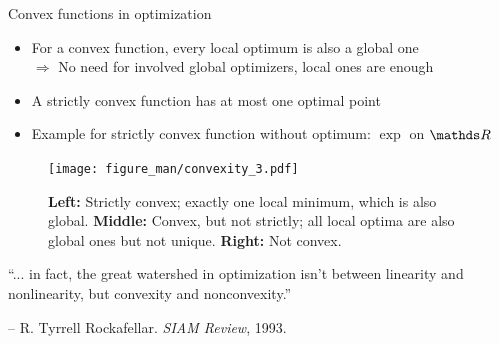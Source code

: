 \documentclass[11pt,compress,t,notes=noshow, xcolor=table]{beamer}
\begin{document}
\begin{vbframe}{Convex functions in optimization}

\begin{itemize}
    \item For a convex function, every local optimum is also a global one \\
        $\Rightarrow$ No need for involved global optimizers, local ones are enough
    \item A strictly convex function has at most one optimal point
    \item Example for strictly convex function without optimum: $\exp$ on $\R$
\end{itemize}

\begin{figure}
    \centering
    \texttt{[image: figure\_man/convexity\_3.pdf]}
    \caption*{\footnotesize
        \textbf{Left:} Strictly convex; exactly one local minimum, which is also global.
        \textbf{Middle:} Convex, but not strictly; all local optima are also global ones but not unique.
        \textbf{Right:} Not convex.}
\end{figure}

\framebreak


    {\large \enquote{... in fact, the great watershed in optimization isn't between linearity and nonlinearity, but convexity and nonconvexity.}}

    \medskip

    -- R. Tyrrell Rockafellar. \textit{SIAM Review}, 1993.


\vspace{-0.5\baselineskip}

\begin{figure}
    \centering
\end{figure}

\end{vbframe}

\endlecture
\end{document}
